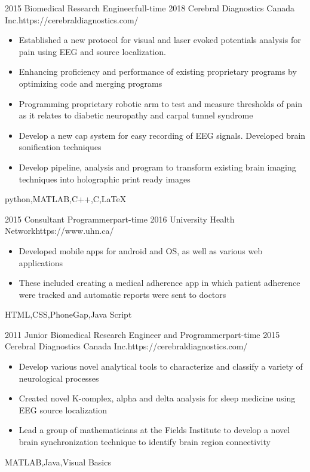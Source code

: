 \begin{experiences}
	\myExperience
	{2015}       {Biomedical Research Engineer}{full-time}
	{2018}      {Cerebral Diagnostics Canada Inc.}{https://cerebraldiagnostics.com/}
	{
		\begin{itemize}
		\item Established a new protocol for visual and laser evoked potentials analysis for pain using EEG and source localization.
		\item Enhancing proficiency and performance of existing proprietary programs by optimizing code and merging programs
		\item Programming proprietary robotic arm to test and measure thresholds of pain as it relates to diabetic neuropathy and carpal tunnel syndrome
		\item Develop a new cap system for easy recording of EEG signals. Developed brain sonification techniques
		\item Develop pipeline, analysis and program to transform existing brain imaging techniques into holographic print ready images
		\end{itemize}
	}
	{python,MATLAB,C++,C,\LaTeX}
	
	\emptySeparator
	
	\myExperience
	{2015}       {Consultant Programmer}{part-time}
	{2016}      {University Health Network}{https://www.uhn.ca/}
	{
		\begin{itemize}
			\item Developed mobile apps for android and OS, as well as various web applications
			\item These included creating a medical adherence app in which patient adherence were tracked and automatic reports were sent to doctors
		\end{itemize}
	}
	{HTML,CSS,PhoneGap,Java Script}
	
	\emptySeparator
	
	\myExperience
	{2011}       {Junior Biomedical Research Engineer and Programmer}{part-time}
	{2015}      {Cerebral Diagnostics Canada Inc.}{https://cerebraldiagnostics.com/}
	{
		\begin{itemize}
			\item Develop various novel analytical tools to characterize and classify a variety of neurological processes
			\item Created novel K-complex, alpha and delta analysis for sleep medicine using EEG source localization
			\item Lead a group of mathematicians at the Fields Institute to develop a novel brain synchronization technique to identify brain region connectivity
		\end{itemize}
	}
	{MATLAB,Java,Visual Basics}
	

\end{experiences}
